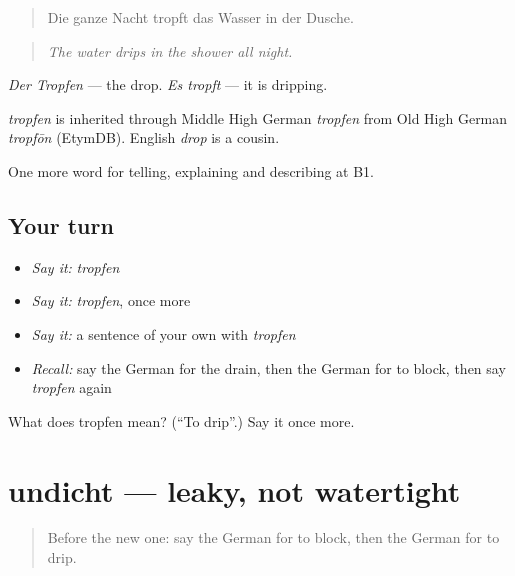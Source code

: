 \begin{quote}
Die ganze Nacht tropft das Wasser in der Dusche.
\end{quote}

\begin{quote}
\emph{The water drips in the shower all night.}
\end{quote}

\emph{Der Tropfen} — the drop. \emph{Es tropft} — it is dripping.

\begin{cousinweb}
\emph{tropfen} is inherited through Middle High German \emph{tropfen} from Old High German \emph{tropfōn} (EtymDB). English \emph{drop} is a cousin.
\end{cousinweb}

\begin{grammarlens}[title={What you've built}]
One more word for telling, explaining and describing at B1.
\end{grammarlens}

\subsection*{Your turn}
\begin{itemize}
\raggedright
  \item \emph{Say it:} \emph{tropfen}
  \item \emph{Say it:} \emph{tropfen}, once more
  \item \emph{Say it:} a sentence of your own with \emph{tropfen}
  \item \emph{Recall:} say the German for the drain, then the German for to block, then say \emph{tropfen} again
\end{itemize}

\begin{tcolorbox}[breakable,colback=teal!4,colframe=teal!35!black,title={Before you move on}]
What does tropfen mean? (\textquotedblleft{}To drip\textquotedblright{}.) Say it once more.
\end{tcolorbox}
\section[undicht]{undicht — leaky, not watertight}

\label{lesson:GE-C428-undicht}



\begin{quote}
Before the new one: say the German for to block, then the German for to drip.
\end{quote}

